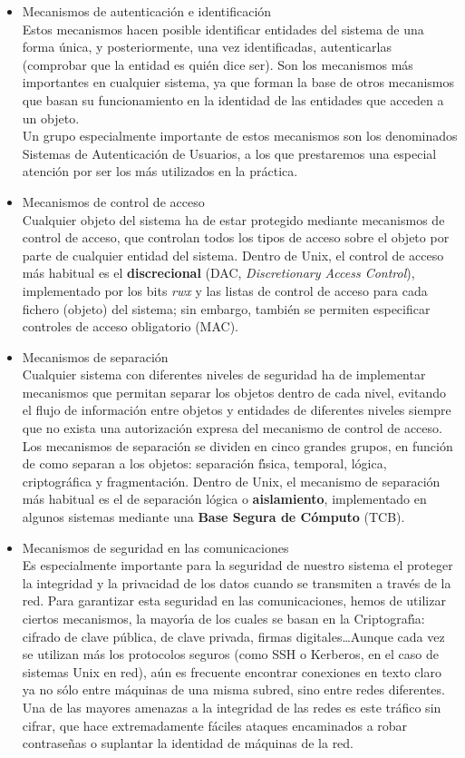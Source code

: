 \begin{itemize}    
\item Mecanismos de autenticaci\'on e identificaci\'on\\
Estos mecanismos hacen posible identificar entidades del sistema de una forma
\'unica, y posteriormente, una vez identificadas, autenticarlas (comprobar que
la entidad es qui\'en dice ser). Son los mecanismos m\'as importantes en 
cualquier sistema, ya que forman la base de otros mecanismos que basan su 
funcionamiento en la identidad de las entidades que acceden a un objeto.\\
Un grupo especialmente importante de estos mecanismos son los denominados 
Sistemas de Autenticaci\'on de Usuarios, a los que prestaremos una especial
atenci\'on por ser los m\'as utilizados en la pr\'actica.
\item Mecanismos de control de acceso\\
Cualquier objeto del sistema ha de estar protegido mediante mecanismos de 
control de acceso, que controlan todos los tipos de acceso sobre el objeto por
parte de cualquier entidad del sistema. Dentro de Unix, el control de acceso 
m\'as habitual es el {\bf discrecional} (DAC, {\it Discretionary Access 
Control}), implementado 
por los bits {\it rwx} y las listas de control de acceso para cada fichero 
(objeto) del sistema; sin embargo, tambi\'en se permiten especificar controles
de acceso obligatorio (MAC).
\item Mecanismos de separaci\'on\\
Cualquier sistema con diferentes niveles de seguridad ha de implementar 
mecanismos que permitan separar los objetos dentro de cada nivel, evitando el
flujo de informaci\'on entre objetos y entidades de diferentes niveles siempre
que no exista una autorizaci\'on expresa del mecanismo de control de acceso.\\
Los mecanismos de separaci\'on se dividen en cinco grandes grupos, en funci\'on
de como separan a los objetos: separaci\'on f\'{\i}sica, temporal, l\'ogica, 
criptogr\'afica y fragmentaci\'on. Dentro de Unix, el mecanismo de separaci\'on
m\'as habitual es el de separaci\'on l\'ogica o {\bf aislamiento}, implementado
en algunos sistemas mediante una {\bf Base Segura de C\'omputo} (TCB).  
\item Mecanismos de seguridad en las comunicaciones\\
Es especialmente importante para la seguridad de nuestro sistema el proteger
la integridad y la privacidad de los datos cuando se transmiten a trav\'es de la
red. Para garantizar esta seguridad en las comunicaciones, hemos de utilizar 
ciertos mecanismos, la mayor\'{\i}a de los cuales se basan en la 
Criptograf\'{\i}a: cifrado de clave p\'ublica, de clave privada, firmas 
digitales\ldots Aunque cada vez se utilizan m\'as los protocolos
seguros (como {\sc SSH} o Kerberos, en el caso de sistemas Unix en red), a\'un
es frecuente encontrar conexiones en texto claro ya no s\'olo entre m\'aquinas
de una misma subred, sino entre redes diferentes. Una de las mayores amenazas
a la integridad de las redes es este tr\'afico sin cifrar, que hace
extremadamente f\'aciles ataques encaminados a robar contrase\~nas o suplantar
la identidad de m\'aquinas de la red.
\end{itemize}
